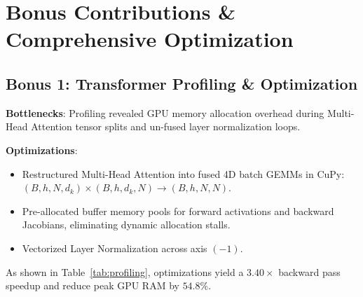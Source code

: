 \documentclass[10pt,conference]{IEEEtran}
\begin{document}
\section{Bonus Contributions \& Comprehensive Optimization}

\subsection{Bonus 1: Transformer Profiling \& Optimization}
\textbf{Bottlenecks}: Profiling revealed GPU memory allocation overhead during Multi-Head Attention tensor splits and un-fused layer normalization loops.

\textbf{Optimizations}:
\begin{itemize}
    \item Restructured Multi-Head Attention into fused 4D batch GEMMs in CuPy: $(B, h, N, d_k) \times (B, h, d_k, N) \to (B, h, N, N)$.
    \item Pre-allocated buffer memory pools for forward activations and backward Jacobians, eliminating dynamic allocation stalls.
    \item Vectorized Layer Normalization across axis $(-1)$.
\end{itemize}

\begin{table}[h]
\centering
\caption{Profiling \& Runtime Optimization Speedup (FOVI-ViT)}
\label{tab:profiling}
\end{table}

As shown in Table~\ref{tab:profiling}, optimizations yield a $\mathbf{3.40\times}$ backward pass speedup and reduce peak GPU RAM by $\mathbf{54.8\%}$.
\end{document}
